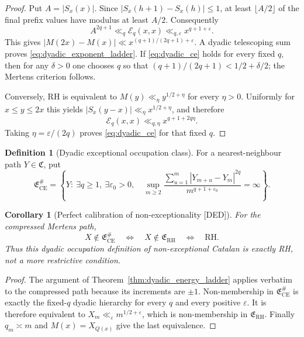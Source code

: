 \documentclass[11pt]{amsart}
\numberwithin{equation}{section}
\theoremstyle{plain}
\newtheorem{corollary}[theorem]{Corollary}
\theoremstyle{definition}
\newtheorem{definition}[theorem]{Definition}
\theoremstyle{remark}
\newcommand{\Mert}{M}
\newcommand{\eps}{\varepsilon}
\begin{document}
\begin{proof}
Put $A=|S_x(x)|$.  Since $|S_x(h+1)-S_x(h)|\leq1$, at least
$\lfloor A/2\rfloor$ of the final prefix values have modulus at least $A/2$.
Consequently
\begin{equation}
 A^{2q+1}\ll_q\mathcal E_q(x,x)
 \ll_{q,\eps}x^{q+1+\eps}.
\end{equation}
This gives
$|\Mert(2x)-\Mert(x)|
\ll x^{(q+1)/(2q+1)+\eps}$.
A dyadic telescoping sum proves \eqref{eq:dyadic_exponent_ladder}.
If \eqref{eq:dyadic_ce} holds for every fixed $q$, then for any
$\delta>0$ one chooses $q$ so that
$(q+1)/(2q+1)<1/2+\delta/2$; the Mertens criterion follows.

Conversely, RH is equivalent to
$\Mert(y)\ll_\eta y^{1/2+\eta}$ for every $\eta>0$.  Uniformly for
$x\leq y\leq2x$ this yields
$|S_x(y-x)|\ll_\eta x^{1/2+\eta}$, and therefore
\begin{equation}
 \mathcal E_q(x,x)\ll_{q,\eta}x^{q+1+2q\eta}.
\end{equation}
Taking $\eta=\eps/(2q)$ proves \eqref{eq:dyadic_ce} for that fixed $q$.
\end{proof}

\begin{definition}[Dyadic exceptional occupation class]
\label{def:dyadic_exceptional_occupation_class}
For a nearest-neighbour path $Y\in\mathfrak C$, put
\begin{equation}
 \mathfrak E_{\mathrm{CE}}^\#
 =
 \left\{Y:\ \exists q\geq1,\ \exists\eps_0>0,\quad
 \sup_{m\geq2}
 \frac{\sum_{u=1}^{m}|Y_{m+u}-Y_m|^{2q}}
 {m^{q+1+\eps_0}}=\infty\right\}.
\label{eq:dyadic_exceptional_occupation_class}
\end{equation}
\end{definition}

\begin{corollary}[Perfect calibration of non-exceptionality \textnormal{[DED]}]
\label{cor:perfect_catalan_calibration}
For the compressed Mertens path,
\begin{equation}
 \boxed{\;
 X\notin\mathfrak E_{\mathrm{CE}}^\#
 \quad\Longleftrightarrow\quad
 X\notin\mathfrak E_{\mathrm{RH}}
 \quad\Longleftrightarrow\quad
 \mathrm{RH}.\;}
\label{eq:perfect_catalan_calibration}
\end{equation}
Thus this dyadic occupation definition of non-exceptional Catalan is exactly
RH, not a more restrictive condition.
\end{corollary}

\begin{proof}
The argument of Theorem~\ref{thm:dyadic_energy_ladder} applies verbatim to
the compressed path because its increments are $\pm1$.  Non-membership in
$\mathfrak E_{\mathrm{CE}}^\#$ is exactly the fixed-$q$ dyadic hierarchy for
every $q$ and every positive $\eps$.  It is therefore equivalent to
$X_m\ll_\eps m^{1/2+\eps}$, which is non-membership in
$\mathfrak E_{\mathrm{RH}}$.  Finally $q_m\asymp m$ and
$\Mert(x)=X_{Q(x)}$ give the last equivalence.
\end{proof}
\end{document}
